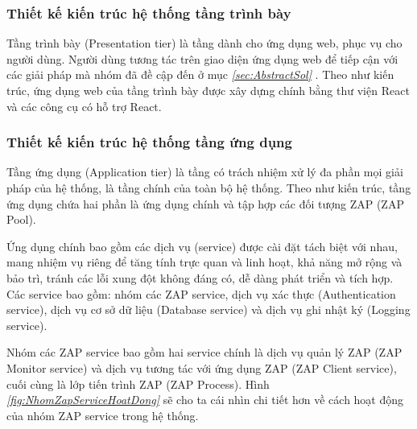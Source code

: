 \subsubsection{Thiết kế kiến trúc hệ thống tầng trình bày}

\tab Tầng trình bày (Presentation tier) là tầng dành cho ứng dụng web, phục vụ cho người dùng.
Người dùng tương tác trên giao diện ứng dụng web để tiếp cận với các giải pháp mà nhóm đã đề cập đến ở mục \textit{\ref{sec:AbstractSol} }.
Theo như kiến trúc, ứng dụng web của tầng trình bày được xây dựng chính bằng thư viện React và các công cụ có hỗ trợ React.

\subsubsection{Thiết kế kiến trúc hệ thống tầng ứng dụng}

\tab Tầng ứng dụng (Application tier) là tầng có trách nhiệm xử lý đa phần mọi giải pháp của hệ thống, là tầng chính của toàn bộ hệ thống.
Theo như kiến trúc, tầng ứng dụng chứa hai phần là ứng dụng chính và tập hợp các đối tượng ZAP (ZAP Pool).
\par

Ứng dụng chính bao gồm các dịch vụ (service) được cài đặt tách biệt với nhau, mang nhiệm vụ riêng để tăng tính trực quan và linh hoạt, khả năng mở rộng và bảo trì, tránh các lỗi xung đột không đáng có, dễ dàng phát triển và tích hợp.
Các service bao gồm: nhóm các ZAP service, dịch vụ xác thực (Authentication service), dịch vụ cơ sở dữ liệu (Database service) và dịch vụ ghi nhật ký (Logging service).
\par

\tab \tab Nhóm các ZAP service bao gồm hai service chính là dịch vụ quản lý ZAP (ZAP Monitor service) và dịch vụ tương tác với ứng dụng ZAP (ZAP Client service), cuối cùng là lớp tiến trình ZAP (ZAP Process).
Hình \textit{\ref{fig:NhomZapServiceHoatDong} } sẽ cho ta cái nhìn chi tiết hơn về cách hoạt động của nhóm ZAP service trong hệ thống.

